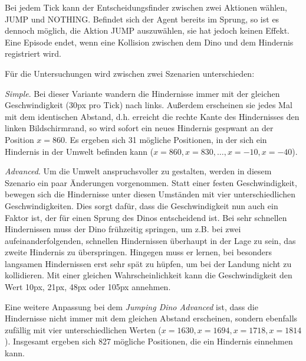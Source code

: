 Bei jedem Tick kann der Entscheidungsfinder zwischen zwei Aktionen wählen, JUMP und NOTHING. Befindet sich der Agent bereits im Sprung, so ist es dennoch möglich, die Aktion JUMP auszuwählen, sie hat jedoch keinen Effekt. Eine Episode endet, wenn eine Kollision zwischen dem Dino und dem Hindernis registriert wird.
\par 
Für die Untersuchungen wird zwischen zwei Szenarien unterschieden:
\par 
\textit{Simple}. Bei dieser Variante wandern die Hindernisse immer mit der gleichen Geschwindigkeit (30px pro Tick) nach links. Außerdem erscheinen sie jedes Mal mit dem identischen Abstand, d.h. erreicht die rechte Kante des Hindernisses den linken Bildschirmrand, so wird sofort ein neues Hindernis gespwant an der Position $x=860$. Es ergeben sich 31 mögliche Positionen, in der sich ein Hindernis in der Umwelt befinden kann ($x=860, x=830, \dots, x=-10, x=-40$).
\par 
\textit{Advanced}. Um die Umwelt anspruchsvoller zu gestalten, werden in diesem Szenario ein paar Änderungen vorgenommen. Statt einer festen Geschwindigkeit, bewegen sich die Hindernisse unter diesen Umständen mit vier unterschiedlichen Geschwindigkeiten. Dies sorgt dafür, dass die Geschwindigkeit nun auch ein Faktor ist, der für einen Sprung des Dinos entscheidend ist. Bei sehr schnellen Hindernissen muss der Dino frühzeitig springen, um z.B. bei zwei aufeinanderfolgenden, schnellen Hindernissen überhaupt in der Lage zu sein, das zweite Hindernis zu überspringen. Hingegen muss er lernen, bei besonders langsamen Hindernissen erst sehr spät zu hüpfen, um bei der Landung nicht zu kollidieren. Mit einer gleichen Wahrscheinlichkeit kann die Geschwindigkeit den Wert 10px, 21px, 48px oder 105px annehmen.
\par
Eine weitere Anpassung bei dem \textit{Jumping Dino Advanced} ist, dass die Hindernisse nicht immer mit dem gleichen Abstand erscheinen, sondern ebenfalls zufällig mit vier unterschiedlichen Werten ($x=1630, x=1694, x=1718, x=1814$). Insgesamt ergeben sich 827 mögliche Positionen, die ein Hindernis einnehmen kann.


